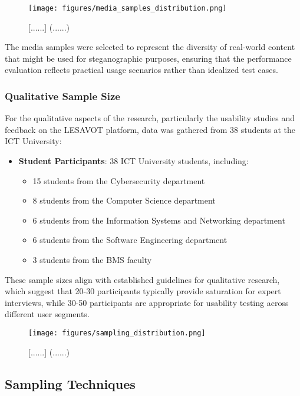 \documentclass[12pt, a4paper, oneside]{book}
\begin{document}
\begin{figure}[htbp]
    \centering
    \texttt{[image: figures/media\_samples\_distribution.png]}
    \caption{[......] (......)}
    \label{fig:media_samples}
\end{figure}

The media samples were selected to represent the diversity of real-world content that might be used for steganographic purposes, ensuring that the performance evaluation reflects practical usage scenarios rather than idealized test cases.

\subsubsection{Qualitative Sample Size}
For the qualitative aspects of the research, particularly the usability studies and feedback on the LESAVOT platform, data was gathered from 38 students at the ICT University:

\begin{itemize}[leftmargin=*]
    \item \textbf{Student Participants}: 38 ICT University students, including:
    \begin{itemize}
        \item 15 students from the Cybersecurity department
        \item 8 students from the Computer Science department
        \item 6 students from the Information Systems and Networking department
        \item 6 students from the Software Engineering department
        \item 3 students from the BMS faculty
    \end{itemize}
\end{itemize}

These sample sizes align with established guidelines for qualitative research, which suggest that 20-30 participants typically provide saturation for expert interviews, while 30-50 participants are appropriate for usability testing across different user segments.

\begin{figure}[htbp]
    \centering
    \texttt{[image: figures/sampling\_distribution.png]}
    \caption{[......] (......)}
    \label{fig:sampling_distribution}
\end{figure}

\subsection{Sampling Techniques}
\end{document}

